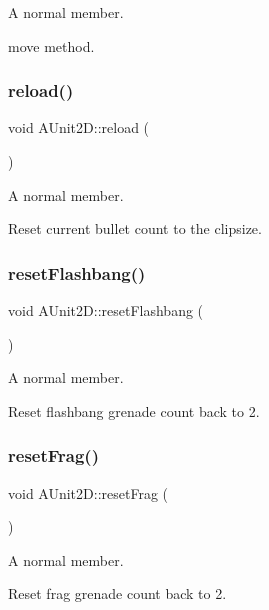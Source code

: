 A normal member. 

move method. \hypertarget{class_a_unit2_d_a4e21cbdac89dcc72f670ad77dfc474cb}{}\label{class_a_unit2_d_a4e21cbdac89dcc72f670ad77dfc474cb} 
\subsubsection{\texorpdfstring{reload()}{reload()}}
{\footnotesize\ttfamily void A\+Unit2\+D\+::reload (\begin{DoxyParamCaption}{ }\end{DoxyParamCaption})}



A normal member. 

Reset current bullet count to the clipsize. \hypertarget{class_a_unit2_d_a509be02c409aec4f9db70eedc954dec8}{}\label{class_a_unit2_d_a509be02c409aec4f9db70eedc954dec8} 
\subsubsection{\texorpdfstring{reset\+Flashbang()}{resetFlashbang()}}
{\footnotesize\ttfamily void A\+Unit2\+D\+::reset\+Flashbang (\begin{DoxyParamCaption}{ }\end{DoxyParamCaption})}



A normal member. 

Reset flashbang grenade count back to 2. \hypertarget{class_a_unit2_d_a895149436f783d3c0bbfe80556196438}{}\label{class_a_unit2_d_a895149436f783d3c0bbfe80556196438} 
\subsubsection{\texorpdfstring{reset\+Frag()}{resetFrag()}}
{\footnotesize\ttfamily void A\+Unit2\+D\+::reset\+Frag (\begin{DoxyParamCaption}{ }\end{DoxyParamCaption})}



A normal member. 

Reset frag grenade count back to 2. \hypertarget{class_a_unit2_d_a80ad176a4ed566c1fb18df231290c8b4}{}\label{class_a_unit2_d_a80ad176a4ed566c1fb18df231290c8b4} 

